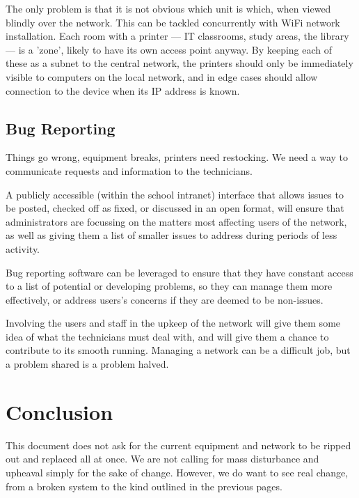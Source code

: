 \documentclass[a4paper,leqno,titlepage]{article}
\begin{document}
The only problem is that it is not obvious which unit is which, when viewed
blindly over the network. This can be tackled concurrently with WiFi network
installation. Each room with a printer  --- IT classrooms,
study areas, the library --- is a 'zone', likely to have its own access point
anyway. By keeping each of these as a subnet to the central network, the
printers should only be immediately visible to computers on the local network,
and in edge cases should allow connection to the device when its IP address
is known.


\subsection{Bug Reporting}

Things go wrong, equipment breaks, printers need restocking. We need a way
to communicate requests and information to the technicians.


A publicly accessible (within the school intranet) interface that allows issues
to be posted, checked off as fixed, or discussed in an open format, will
ensure that administrators are focussing on the matters most affecting users of
the network, as well as giving them a list of smaller issues to address during
periods of less activity.


Bug reporting software can be leveraged to ensure that they have constant access
to a list of potential or developing problems, so they can manage them more
effectively, or address users's concerns if they are deemed to be non-issues.


Involving the users and staff in the upkeep
of the network will give them some idea of what the technicians must
deal with, and will give them a chance to contribute to its smooth running.
Managing a network can be a difficult job, but a problem shared is a problem
halved.



\break








\section{Conclusion}

This document does not ask for the current equipment and network to be ripped
out and replaced all at once. We are not calling for mass disturbance and
upheaval simply for the sake of change.
However, we do want to see real change, from a
broken system to the kind outlined in the previous pages.
\end{document}
